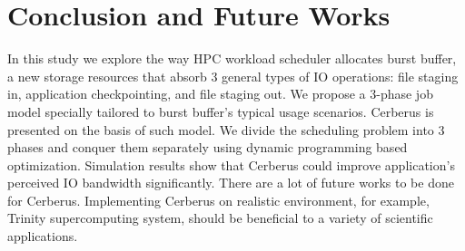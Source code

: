 \section{Conclusion and Future Works}
\label{Sec:Conclusion}

In this study we explore the way HPC workload scheduler allocates burst buffer,
a new storage resources that absorb 3 general types of IO operations:
file staging in, application checkpointing, and file staging out.
We propose a 3-phase job model specially
tailored to burst buffer's typical usage scenarios.
Cerberus is presented on the basis of such model.
We divide the scheduling problem into 3 phases
and conquer them separately using dynamic programming based optimization.
Simulation results show that
Cerberus could improve application's perceived IO bandwidth significantly.
There are a lot of future works to be done for Cerberus.
Implementing Cerberus on realistic environment, for example,
Trinity supercomputing system, should be beneficial to a variety of
scientific applications.
